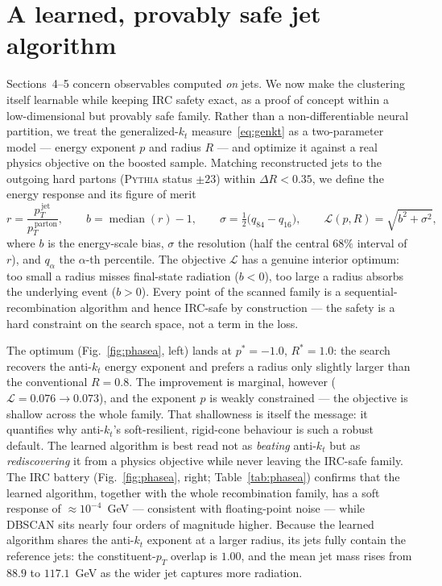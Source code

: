 \documentclass[11pt]{article}
\newcommand{\kt}{k_{t}}
\newcommand{\antikt}{anti-$\kt$}
\newcommand{\pt}{p_{T}}
\newcommand{\dR}{\Delta R}
\begin{document}
\section{A learned, provably safe jet algorithm}
Sections~4--5 concern observables computed \emph{on} jets. We now make the clustering itself
learnable while keeping IRC safety exact, as a proof of concept within a low-dimensional but
provably safe family. Rather than a non-differentiable neural partition, we treat the
generalized-$\kt$ measure~\eqref{eq:genkt} as a two-parameter model --- energy exponent $p$
and radius $R$ --- and optimize it against a real physics objective on the boosted sample. Matching reconstructed jets to the outgoing hard partons (\textsc{Pythia}
status $\pm23$) within $\dR<0.35$, we define the energy response and its figure of merit
\begin{equation}
r = \frac{p_T^{\,\mathrm{jet}}}{p_T^{\,\mathrm{parton}}},
\qquad
b = \operatorname{median}(r) - 1,
\qquad
\sigma = \tfrac12\big(q_{84}-q_{16}\big),
\qquad
\mathcal{L}(p,R) = \sqrt{b^{2}+\sigma^{2}},
\label{eq:objective}
\end{equation}
where $b$ is the energy-scale bias, $\sigma$ the resolution (half the central $68\%$
interval of $r$), and $q_{\alpha}$ the $\alpha$-th percentile. The objective $\mathcal{L}$
has a genuine interior optimum: too small a radius misses final-state radiation ($b<0$),
too large a radius absorbs the underlying event ($b>0$). Every point of the scanned family
is a sequential-recombination algorithm and hence IRC-safe by construction --- the safety
is a hard constraint on the search space, not a term in the loss.

The optimum (Fig.~\ref{fig:phasea}, left) lands at $p^{\ast}=-1.0$, $R^{\ast}=1.0$: the
search recovers the \antikt{} energy exponent and prefers a radius only slightly larger than
the conventional $R=0.8$. The improvement is marginal, however ($\mathcal{L}=0.076\to0.073$),
and the exponent $p$ is weakly constrained --- the objective is shallow across the whole
family. That shallowness is itself the message: it quantifies why \antikt's soft-resilient,
rigid-cone behaviour is such a robust default. The learned algorithm is best read not as
\emph{beating} \antikt{} but as \emph{rediscovering} it from a physics objective while never
leaving the IRC-safe family. The IRC battery (Fig.~\ref{fig:phasea}, right; Table~\ref{tab:phasea})
confirms that the learned algorithm, together with the whole recombination family, has a
soft response of $\approx10^{-4}$~GeV --- consistent with floating-point noise --- while
DBSCAN sits nearly four orders of magnitude higher. Because the learned algorithm shares the
\antikt{} exponent at a larger radius, its jets fully contain the reference jets:
the constituent-$\pt$ overlap is $1.00$, and the mean jet mass rises from $88.9$ to
$117.1$~GeV as the wider jet captures more radiation.
\end{document}
